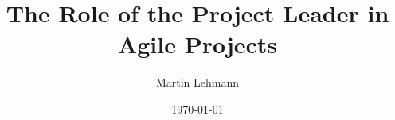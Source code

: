 \title{The Role of the Project Leader in Agile Projects}
\author{Martin Lehmann}
\date{\today}
\maketitle

